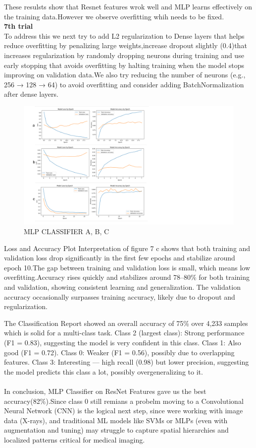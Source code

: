 \documentclass{article}
\begin{document}
These resulsts show that Resnet features wrok well and MLP learns effectively on the training data.However we observe overfitting whih needs to be fixed.\\
\textbf{7th trial }\\
To address this we next try to add L2 regularization to Dense layers that helps reduce overfitting by penalizing large weights,increase dropout slightly (0.4)that increases regularization by randomly dropping neurons during training and use early stopping that avoids overfitting by halting training when the model stops improving on validation data.We also try reducing the number of neurons (e.g., 256 → 128 → 64) to avoid overfitting and consider adding BatchNormalization after dense layers.
\begin{figure}[ht] %
    \centering
    \includegraphics[width=1.0\linewidth]{comparemlp2.png}
    \caption{MLP CLASSIFIER A, B, C}
    \label{MLP CLASSIFIER_compare}
\end{figure}
Loss and Accuracy Plot Interpretation of figure 7 c shows that both training and validation loss drop significantly in the first few epochs and stabilize around epoch 10.The gap between training and validation loss is small, which means low overfitting.Accuracy rises quickly and stabilizes around 78–80\% for both training and validation, showing consistent learning and generalization.
The validation accuracy occasionally surpasses training accuracy, likely due to dropout and regularization.

The Classification Report showed an overall accuracy of 75\% over 4,233 samples which is solid for a multi-class task.
Class 2 (largest class): Strong performance (F1 = 0.83), suggesting the model is very confident in this class.
Class 1: Also good (F1 = 0.72).
Class 0: Weaker (F1 = 0.56), possibly due to overlapping features.
Class 3: Interesting — high recall (0.98) but lower precision, suggesting the model predicts this class a lot, possibly overgeneralizing to it.\\
\\
In conclusion, MLP Classifier on ResNet Features gave us the best accuracy(82\%).Since class 0 still remians a probelm moving to a Convolutional Neural Network (CNN) is the logical next step, since were working with image data (X-rays), and traditional ML models like SVMs or MLPs (even with augmentation and tuning) may struggle to capture spatial hierarchies and localized patterns critical for medical imaging.\\
\end{document}
